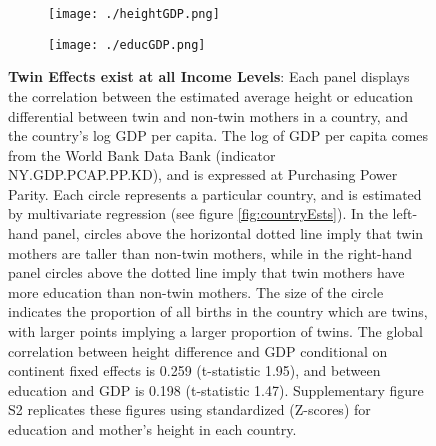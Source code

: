 \documentclass{nature}
\begin{document}
\begin{linenumbers}
\begin{spacing}{1}
\begin{figure}[htpb!]
\begin{subfigure}{.5\textwidth}
  \texttt{[image: ./heightGDP.png]}
\end{subfigure}%
\begin{subfigure}{.5\textwidth}
  \texttt{[image: ./educGDP.png]}
\end{subfigure}
\vspace{5mm}
\caption{\textbf{Twin Effects exist at all Income Levels}: Each panel displays the correlation between the estimated average height or education differential between twin and non-twin mothers in a country, and the country's log GDP per capita. The log of GDP per capita comes from the World Bank Data Bank (indicator NY.GDP.PCAP.PP.KD), and is expressed at Purchasing Power Parity.  Each circle represents a particular country, and is estimated by multivariate regression (see figure \ref{fig:countryEsts}).  In the left-hand panel, circles above the horizontal dotted line imply that twin mothers are taller than non-twin mothers, while in the right-hand panel circles above the dotted line imply that twin mothers have more education than non-twin mothers. The size of the circle indicates the proportion of all births in the country which are twins, with larger points implying a larger proportion of twins. The global correlation between height difference and GDP conditional on continent fixed effects is 0.259 (t-statistic 1.95), and between education and GDP is 0.198 (t-statistic 1.47). Supplementary figure S2 replicates these figures using standardized (Z-scores) for education and mother's height in each country.}
\label{fig:GDPEsts}
\end{figure}




\end{spacing}
\end{linenumbers}
\end{document}
